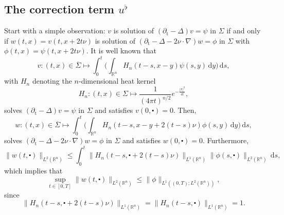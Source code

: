 \documentclass[10pt,a4paper]{amsart}
\newcommand{\R}{\mathbb{R}}
\newcommand{\dd}{\mathrm{d}}
\newcommand{\tm}{\mathrm{t}}
\newcommand{\marnote}[1]{\marginpar{\footnotesize #1}} %
\begin{document}

\subsection{The correction term \texorpdfstring{$u^\flat$}{uflat}}
Start with a simple observation: $v$ is solution of
$(\partial_\tm - \Delta) v = \psi$ in $\Sigma$ if and only if
$w (t, x) = v (t, x + 2t \nu)$ is solution of $(\partial_\tm - \Delta - 2 \nu \cdot \nabla) w = \phi $ in
$\Sigma$ with $\phi (t, x) = \psi (t, x + 2t \nu)$.
It is well known that
\[ v: (t, x) \in \overline{\Sigma} \longmapsto \int_0^t \Big( \int_{\R^n} H_n (t-s, x-y) \psi(s, y) \, \dd y \Big) \, \dd s, \]
with $H_n$ denoting the $n$-dimensional heat kernel
\begin{equation}
\label{id:heat_kernel}
H_n: (t, x) \in \Sigma \longmapsto \frac{1}{(4\pi t)^{n/2}} e^{-\frac{|x|^2}{4t}},
\end{equation}
solves $(\partial_\tm - \Delta) v = \psi$ in $\Sigma$ and satisfies
$v(0, \centerdot) = 0$. Then,
\[ w: (t, x) \in \overline{\Sigma} \longmapsto \int_0^t \Big( \int_{\R^n} H_n (t-s, x - y + 2(t-s) \nu) \phi(s, y) \, \dd y \Big) \, \dd s, \]
solves $(\partial_\tm - \Delta - 2 \nu \cdot \nabla) w = \phi $ in $\Sigma$ 
and satisfies $w(0, \centerdot) = 0$. Furthermore,
\[ \|w(t, \centerdot)\|_{L^2(\R^n)} \leq \int_0^t \| H_n (t-s, \centerdot + 2(t-s) \nu) \|_{L^1(\R^n)} \| \phi(s, \centerdot)\|_{L^2(\R^n)} \, \dd s,\]
which implies that
\[ \sup_{t \in [0, T]} \|w(t, \centerdot)\|_{L^2(\R^n)} \leq \| \phi\|_{L^1((0,T); L^2(\R^n))}, \]
since
\begin{equation}
\label{id:heat_L1_tranlation-invariant}
\| H_n (t-s, \centerdot + 2(t-s) \nu) \|_{L^1(\R^n)} = \| H_n (t-s, \centerdot) \|_{L^1(\R^n)} = 1.
\end{equation}
\end{document}
